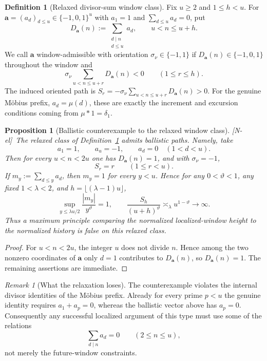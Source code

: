 \documentclass[11pt]{amsart}
\numberwithin{equation}{section}
\theoremstyle{plain}
\newtheorem{proposition}[theorem]{Proposition}
\theoremstyle{definition}
\newtheorem{definition}[theorem]{Definition}
\theoremstyle{remark}
\newtheorem{remark}[theorem]{Remark}
\newcommand{\tagNE}{\textup{[N-el]}}
\begin{document}
\begin{definition}[Relaxed divisor-sum window class]
\label{def:relaxed-divisor-cone}
Fix $u\ge2$ and $1\le h<u$.  For
$\mathbf a=(a_d)_{d\le u}\in\{-1,0,1\}^u$ with $a_1=1$ and
$\sum_{d\le u}a_d=0$, put
\[
D_{\mathbf a}(n):=\sum_{\substack{d\mid n\\ d\le u}}a_d,
\qquad u<n\le u+h.
\]
We call $\mathbf a$ window-admissible with orientation $\sigma_\nu\in\{-1,1\}$ if
$D_{\mathbf a}(n)\in\{-1,0,1\}$ throughout the window and
\[
\sigma_\nu\sum_{u<n\le u+r}D_{\mathbf a}(n)<0
\qquad(1\le r\le h).
\]
The induced oriented path is
$S_r=-\sigma_\nu\sum_{u<n\le u+r}D_{\mathbf a}(n)>0$.
For the genuine M\"obius prefix, $a_d=\mu(d)$, these are exactly the
increment and excursion conditions coming from $\mu*1=\delta_1$.
\end{definition}

\begin{proposition}[Ballistic counterexample to the relaxed window class]
\label{prop:relaxed-ballistic}
\tagNE\ The relaxed class of Definition~\ref{def:relaxed-divisor-cone} admits
ballistic paths.  Namely, take
\[
a_1=1,\qquad a_u=-1,\qquad a_d=0\quad(1<d<u).
\]
Then for every $u<n<2u$ one has $D_{\mathbf a}(n)=1$, and with $\sigma_\nu=-1$,
\[
S_r=r\qquad(1\le r<u).
\]
If $m_y:=\sum_{d\le y}a_d$, then $m_y=1$ for every $y<u$.  Hence for
any $0<\vartheta<1$, any fixed $1<\lambda<2$, and
$h=\lfloor(\lambda-1)u\rfloor$,
\[
\sup_{y\le\lambda u/2}\frac{|m_y|}{y^\vartheta}=1,
\qquad
\frac{S_h}{(u+h)^\vartheta}\asymp_\lambda u^{1-\vartheta}\longrightarrow\infty.
\]
Thus a maximum principle comparing the normalized localized-window height
to the normalized history is false on this relaxed class.
\end{proposition}

\begin{proof}
For $u<n<2u$, the integer $u$ does not divide $n$.  Hence among the two
nonzero coordinates of $\mathbf a$ only $d=1$ contributes to $D_{\mathbf a}(n)$,
so $D_{\mathbf a}(n)=1$.  The remaining assertions are immediate.
\end{proof}

\begin{remark}[What the relaxation loses]
\label{rem:relaxed-loses}
The counterexample violates the internal divisor identities of the M\"obius
prefix.  Already for every prime $p<u$ the genuine identity requires
$a_1+a_p=0$, whereas the ballistic vector above has
$a_p=0$.  Consequently any successful localized argument of this type
must use some of the relations
\[
\sum_{d\mid n}a_d=0\qquad(2\le n\le u),
\]
not merely the future-window constraints.
\end{remark}
\end{document}
